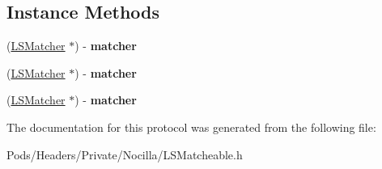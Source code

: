 \subsection*{Instance Methods}
\begin{DoxyCompactItemize}
\item 
\hypertarget{protocol_l_s_matcheable-p_a87e5d9502268fea760d260648700b6bf}{(\hyperlink{interface_l_s_matcher}{L\-S\-Matcher} $\ast$) -\/ {\bfseries matcher}}\label{protocol_l_s_matcheable-p_a87e5d9502268fea760d260648700b6bf}

\item 
\hypertarget{protocol_l_s_matcheable-p_a87e5d9502268fea760d260648700b6bf}{(\hyperlink{interface_l_s_matcher}{L\-S\-Matcher} $\ast$) -\/ {\bfseries matcher}}\label{protocol_l_s_matcheable-p_a87e5d9502268fea760d260648700b6bf}

\item 
\hypertarget{protocol_l_s_matcheable-p_a87e5d9502268fea760d260648700b6bf}{(\hyperlink{interface_l_s_matcher}{L\-S\-Matcher} $\ast$) -\/ {\bfseries matcher}}\label{protocol_l_s_matcheable-p_a87e5d9502268fea760d260648700b6bf}

\end{DoxyCompactItemize}


The documentation for this protocol was generated from the following file\-:\begin{DoxyCompactItemize}
\item 
Pods/\-Headers/\-Private/\-Nocilla/L\-S\-Matcheable.\-h\end{DoxyCompactItemize}

